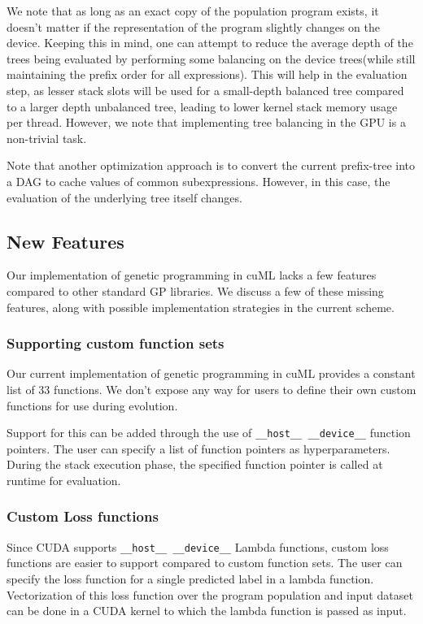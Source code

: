 We note that as long as an exact copy of the population program exists, it doesn't matter if the representation of the program slightly changes on the device. Keeping this in mind, one can attempt to reduce the average depth of the trees being evaluated by performing some balancing on the device trees(while still maintaining the prefix order for all expressions). This will help in the evaluation step, as lesser stack slots will be used for a small-depth balanced tree compared to a larger depth unbalanced tree, leading to lower kernel stack memory usage per thread. However, we note that implementing tree balancing in the GPU is a non-trivial task.

Note that another optimization approach is to convert the current prefix-tree into a DAG to cache values of common subexpressions. However, in this case, the evaluation of the underlying tree itself changes. 

\subsection{New Features}
\label{subsec:newfeatures}

Our implementation of genetic programming in cuML lacks a few features compared to other standard GP libraries. We discuss a few of these missing features, along with possible implementation strategies in the current scheme. 

\subsubsection{Supporting custom function sets}
Our current implementation of genetic programming in cuML provides a constant list of $33$ functions. We don't expose any way for users to define their own custom functions for use during evolution. 

Support for this can be added through the use of \lstinline!__host__ __device__! function pointers. The user can specify a list of function pointers as hyperparameters. During the stack execution phase, the specified function pointer is called at runtime for evaluation.

\subsubsection{Custom Loss functions}

Since CUDA supports \lstinline!__host__ __device__! Lambda functions, custom loss functions are easier to support compared to custom function sets. The user can specify the loss function for a single predicted label in a lambda function. Vectorization of this loss function over the program population and input dataset can be done in a CUDA kernel to which the lambda function is passed as input. 
